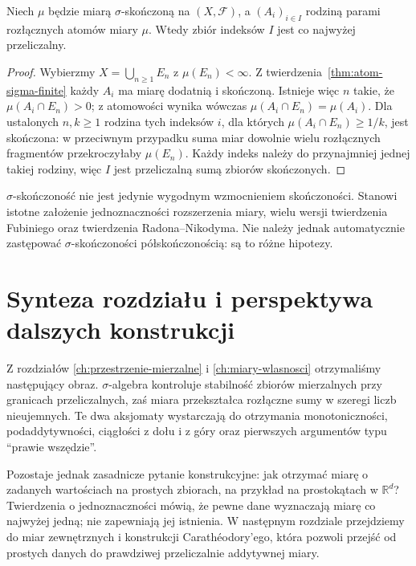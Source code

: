 \begin{wniosek}
\label{cor:countably-many-disjoint-atoms}
Niech $\mu$ będzie miarą $\sigma$-skończoną na
$(X,\mathcal F)$, a $(A_i)_{i\in I}$ rodziną parami rozłącznych
atomów miary $\mu$. Wtedy zbiór indeksów $I$ jest co najwyżej
przeliczalny.
\end{wniosek}
\begin{proof}
Wybierzmy $X=\bigcup_{n\ge1}E_n$ z $\mu(E_n)<\infty$.
Z twierdzenia~\ref{thm:atom-sigma-finite} każdy $A_i$ ma
miarę dodatnią i skończoną. Istnieje więc $n$ takie, że
$\mu(A_i\cap E_n)>0$; z atomowości wynika wówczas
$\mu(A_i\cap E_n)=\mu(A_i)$. Dla ustalonych $n,k\ge1$
rodzina tych indeksów $i$, dla których
$\mu(A_i\cap E_n)\ge1/k$, jest skończona:
w przeciwnym przypadku suma miar dowolnie wielu
rozłącznych fragmentów przekroczyłaby $\mu(E_n)$.
Każdy indeks należy do przynajmniej jednej takiej
rodziny, więc $I$ jest przeliczalną sumą zbiorów
skończonych.
\end{proof}

\begin{uwaga}
$\sigma$-skończoność nie jest jedynie wygodnym
wzmocnieniem skończoności. Stanowi istotne założenie
jednoznaczności rozszerzenia miary, wielu wersji
twierdzenia Fubiniego oraz twierdzenia Radona--Nikodyma.
Nie należy jednak automatycznie zastępować
$\sigma$-skończoności półskończonością: są to różne hipotezy.
\end{uwaga}

\section{Synteza rozdziału i perspektywa dalszych konstrukcji}

Z rozdziałów \ref{ch:przestrzenie-mierzalne} i
\ref{ch:miary-wlasnosci} otrzymaliśmy następujący obraz.
$\sigma$-algebra kontroluje stabilność zbiorów mierzalnych
przy granicach przeliczalnych, zaś miara przekształca
rozłączne sumy w szeregi liczb nieujemnych. Te dwa
aksjomaty wystarczają do otrzymania monotoniczności,
podaddytywności, ciągłości z dołu i z góry oraz pierwszych
argumentów typu ``prawie wszędzie''.

Pozostaje jednak zasadnicze pytanie konstrukcyjne:
jak otrzymać miarę o zadanych wartościach na prostych
zbiorach, na przykład na prostokątach w $\mathbb R^d$?
Twierdzenia o jednoznaczności mówią, że pewne dane
wyznaczają miarę co najwyżej jedną; nie zapewniają
jej istnienia. W następnym rozdziale przejdziemy
do miar zewnętrznych i konstrukcji Carathéodory'ego,
która pozwoli przejść od prostych danych do prawdziwej
przeliczalnie addytywnej miary.